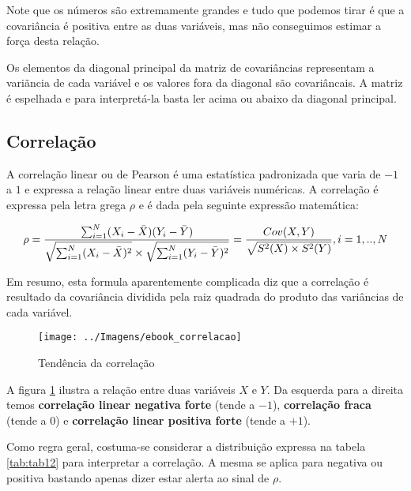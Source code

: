 \documentclass[12pt,]{style/krantz}
\renewenvironment{quote}{\begin{VF}}{\end{VF}}
\theoremstyle{definition}
\theoremstyle{definition}
\theoremstyle{definition}
\theoremstyle{remark}
\begin{document}
Note que os números são extremamente grandes e tudo que podemos tirar é
que a covariância é positiva entre as duas variáveis, mas não
conseguimos estimar a força desta relação.

\begin{quote}
Os elementos da diagonal principal da matriz de covariâncias representam
a variãncia de cada variável e os valores fora da diagonal são
covariâncais. A matriz é espelhada e para interpretá-la basta ler acima
ou abaixo da diagonal principal.
\end{quote}

\subsection{Correlação}\label{correlacao}

A correlação linear ou de Pearson é uma estatística padronizada que
varia de \(-1\) a \(1\) e expressa a relação linear entre duas variáveis
numéricas. A correlação é expressa pela letra grega \(\rho\) e é dada
pela seguinte expressão matemática:

\[\rho = \frac {\sum_{i=1}^N(X_i-\bar X)(Y_i - \bar Y)}{\sqrt{\sum_{i=1}^N(X_i-\bar X)^2} \times \sqrt{\sum_{i=1}^N(Y_i-\bar Y)^2}}=\frac{Cov(X,Y)}{\sqrt{S^2(X) \times S^2(Y)}}, \\ i=1,..,N\]

Em resumo, esta formula aparentemente complicada diz que a correlação é
resultado da covariância dividida pela raiz quadrada do produto das
variâncias de cada variável.

\begin{figure}[H]

{\centering \texttt{[image: ../Imagens/ebook\_correlacao]} 

}

\caption{Tendência da correlação}\label{fig:fig11}
\end{figure}

A figura \ref{fig:fig11} ilustra a relação entre duas variáveis \(X\) e
\(Y\). Da esquerda para a direita temos \textbf{correlação linear
negativa forte} (tende a \(-1\)), \textbf{correlação fraca} (tende a
\(0\)) e \textbf{correlação linear positiva forte} (tende a \(+1\)).

Como regra geral, costuma-se considerar a distribuição expressa na
tabela \ref{tab:tab12} para interpretar a correlação. A mesma se aplica
para negativa ou positiva bastando apenas dizer estar alerta ao sinal de
\(\rho\).
\end{document}
